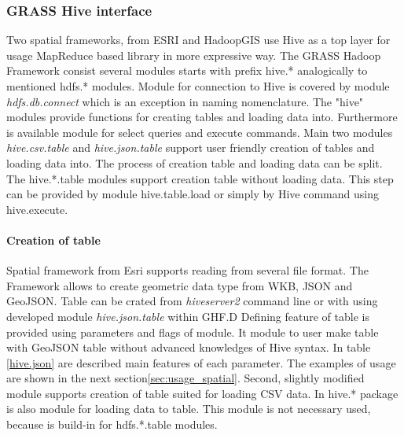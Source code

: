 \documentclass[a4paper,12pt,oneside]{report}
\begin{document}
\subsubsection{GRASS Hive interface}
Two spatial frameworks, from ESRI and HadoopGIS use Hive as a top layer for usage MapReduce based library in more expressive way. The GRASS Hadoop Framework consist several modules starts with prefix hive.* analogically to mentioned hdfs.* modules. Module for connection to Hive is covered by module \textit{hdfs.db.connect} which is an exception in naming nomenclature. The "hive" modules provide functions for creating tables and loading data into. Furthermore is available module for select queries and execute commands. Main two modules \textit{hive.csv.table} and \textit{hive.json.table} support user friendly creation of tables and loading data into. The process of creation table and loading data can be split. The hive.*.table modules support creation table without loading data. This step can be provided by module hive.table.load or simply by Hive command using hive.execute.


\paragraph{Creation of table} Spatial framework from Esri supports reading  from several file format.  The Framework allows to create geometric data type from  WKB, JSON and GeoJSON. Table can be crated from \textit{hiveserver2} command line or with using developed module  \textit{hive.json.table} within GHF.D Defining feature of table is provided using parameters and flags of module. It module to user make table with GeoJSON table without advanced knowledges of Hive syntax. In table \ref{hive.json} are described main features of each parameter. The examples of usage are shown in the next section\ref{sec:usage_spatial}. Second, slightly modified module supports creation of table suited for loading CSV data. In hive.* package is also module for loading data to table. This module is not necessary used, because is build-in for hdfs.*.table modules. 
\end{document}
